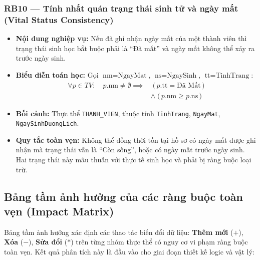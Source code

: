 \subsubsection{RB10 --- Tính nhất quán trạng thái sinh tử và ngày mất (Vital Status Consistency)}
\begin{itemize}
    \item \textbf{Nội dung nghiệp vụ:} Nếu đã ghi nhận ngày mất của một thành viên thì trạng thái sinh học bắt buộc phải là ``Đã mất'' và ngày mất không thể xảy ra trước ngày sinh.
    \item \textbf{Biểu diễn toán học:} Gọi $\text{nm} = \text{NgayMat}$, $\text{ns} = \text{NgaySinh}$, $\text{tt} = \text{TinhTrang}$:
    \begin{equation}
        \begin{aligned}
            \forall p \in TV: \quad p.\text{nm} \ne \emptyset \implies
            &\;\bigl(\,p.\text{tt} = \text{Đã Mất}\,\bigr) \\
            &\land\; \bigl(\,p.\text{nm} \ge p.\text{ns}\,\bigr)
        \end{aligned}
    \end{equation}
    \item \textbf{Bối cảnh:} Thực thể \texttt{THANH\_VIEN}, thuộc tính \texttt{TinhTrang}, \texttt{NgayMat}, \texttt{NgaySinhDuongLich}.
    \item \textbf{Quy tắc toàn vẹn:} Không thể đồng thời tồn tại hồ sơ có ngày mất được ghi nhận mà trạng thái vẫn là ``Còn sống'', hoặc có ngày mất trước ngày sinh. Hai trạng thái này mâu thuẫn với thực tế sinh học và phải bị ràng buộc loại trừ.
\end{itemize}

\subsection{Bảng tầm ảnh hưởng của các ràng buộc toàn vẹn (Impact Matrix)}
Bảng tầm ảnh hưởng xác định các thao tác biến đổi dữ liệu: \textbf{Thêm mới} ($+$), \textbf{Xóa} ($-$), \textbf{Sửa đổi} ($\ast$) trên từng nhóm thực thể có nguy cơ vi phạm ràng buộc toàn vẹn. Kết quả phân tích này là đầu vào cho giai đoạn thiết kế logic và vật lý:

